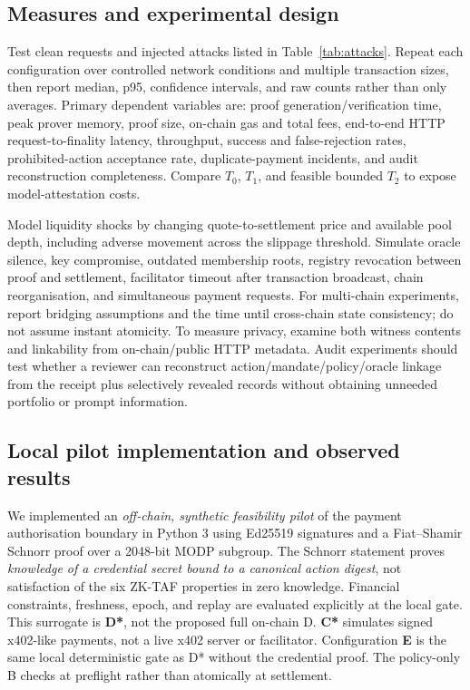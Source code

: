 \documentclass[conference]{IEEEtran}
\begin{document}
\subsection{Measures and experimental design}
Test clean requests and injected attacks listed in Table~\ref{tab:attacks}. Repeat each configuration over controlled network conditions and multiple transaction sizes, then report median, p95, confidence intervals, and raw counts rather than only averages. Primary dependent variables are: proof generation/verification time, peak prover memory, proof size, on-chain gas and total fees, end-to-end HTTP request-to-finality latency, throughput, success and false-rejection rates, prohibited-action acceptance rate, duplicate-payment incidents, and audit reconstruction completeness. Compare \(T_0\), \(T_1\), and feasible bounded \(T_2\) to expose model-attestation costs.

Model liquidity shocks by changing quote-to-settlement price and available pool depth, including adverse movement across the slippage threshold. Simulate oracle silence, key compromise, outdated membership roots, registry revocation between proof and settlement, facilitator timeout after transaction broadcast, chain reorganisation, and simultaneous payment requests. For multi-chain experiments, report bridging assumptions and the time until cross-chain state consistency; do not assume instant atomicity. To measure privacy, examine both witness contents and linkability from on-chain/public HTTP metadata. Audit experiments should test whether a reviewer can reconstruct action/mandate/policy/oracle linkage from the receipt plus selectively revealed records without obtaining unneeded portfolio or prompt information.

\subsection{Local pilot implementation and observed results}
We implemented an \emph{off-chain, synthetic feasibility pilot} of the payment authorisation boundary in Python 3 using Ed25519 signatures and a Fiat--Shamir Schnorr proof over a 2048-bit MODP subgroup. The Schnorr statement proves \emph{knowledge of a credential secret bound to a canonical action digest}, not satisfaction of the six ZK-TAF properties in zero knowledge. Financial constraints, freshness, epoch, and replay are evaluated explicitly at the local gate. This surrogate is \textbf{D*}, not the proposed full on-chain D. \textbf{C*} simulates signed x402-like payments, not a live x402 server or facilitator. Configuration \textbf{E} is the same local deterministic gate as D* without the credential proof. The policy-only B checks at preflight rather than atomically at settlement.
\end{document}
